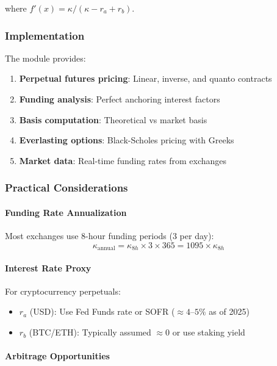 where $f'(x) = \kappa/(\kappa - r_a + r_b)$.

\subsubsection{Implementation}

The module provides:

\begin{enumerate}
  \item \textbf{Perpetual futures pricing}: Linear, inverse, and quanto contracts
  \item \textbf{Funding analysis}: Perfect anchoring interest factors
  \item \textbf{Basis computation}: Theoretical vs market basis
  \item \textbf{Everlasting options}: Black-Scholes pricing with Greeks
  \item \textbf{Market data}: Real-time funding rates from exchanges
\end{enumerate}

\subsubsection{Practical Considerations}

\paragraph{Funding Rate Annualization}

Most exchanges use 8-hour funding periods (3 per day):
\[
\kappa_{\text{annual}} = \kappa_{8h} \times 3 \times 365 = 1095 \times \kappa_{8h}
\]

\paragraph{Interest Rate Proxy}

For cryptocurrency perpetuals:
\begin{itemize}
  \item $r_a$ (USD): Use Fed Funds rate or SOFR ($\approx 4$--$5\%$ as of 2025)
  \item $r_b$ (BTC/ETH): Typically assumed $\approx 0$ or use staking yield
\end{itemize}

\paragraph{Arbitrage Opportunities}

